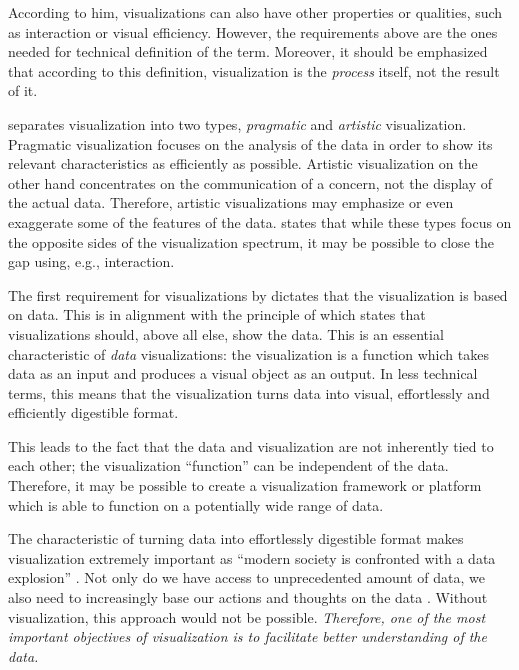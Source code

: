 According to him, visualizations can also have other properties or qualities, such as interaction or visual efficiency. However, the requirements above are the ones needed for technical definition of the term. Moreover, it should be emphasized that according to this definition, visualization is the \emph{process} itself, not the result of it.

\citet[chap.~4]{kosara_visualization_2007} separates visualization into two types, \emph{pragmatic} and \emph{artistic} visualization. Pragmatic visualization focuses on the analysis of the data in order to show its relevant characteristics as efficiently as possible. Artistic visualization on the other hand concentrates on the communication of a concern, not the display of the actual data. Therefore, artistic visualizations may emphasize or even exaggerate some of the features of the data. \citeauthor{kosara_visualization_2007} states that while these types focus on the opposite sides of the visualization spectrum, it may be possible to close the gap using, e.g., interaction.

The first requirement for visualizations by \citet{kosara_visualization_2007} dictates that the visualization is based on data. This is in alignment with the principle of \citet{tufte_visual_1986} which states that visualizations should, above all else, show the data. This is an essential characteristic of \emph{data} visualizations: the visualization is a function which takes data as an input and produces a visual object as an output. In less technical terms, this means that the visualization turns data into visual, effortlessly and efficiently digestible format.

This leads to the fact that the data and visualization are not inherently tied to each other; the visualization ``function'' can be independent of the data. Therefore, it may be possible to create a visualization framework or platform which is able to function on a potentially wide range of data.

The characteristic of turning data into effortlessly digestible format makes visualization extremely important as ``modern society is confronted with a data explosion'' \citep{van_wijk_value_2005}. Not only do we have access to unprecedented amount of data, we also need to increasingly base our actions and thoughts on the data \citep{van_wijk_value_2005}. Without visualization, this approach would not be possible. \emph{Therefore, one of the most important objectives of visualization is to facilitate better understanding of the data.}

